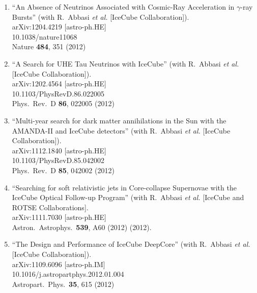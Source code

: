 \begin{enumerate}

\item ``An Absence of Neutrinos Associated with Cosmic-Ray
        Acceleration in   $\gamma$-ray Bursts'' (with
        R.~Abbasi {\it et al.}  [IceCube   Collaboration]).
        \\{}arXiv:1204.4219 [astro-ph.HE]
        \\{}10.1038/nature11068 \\{}Nature {\bf 484}, 351
        (2012) %

\item ``A Search for UHE Tau Neutrinos with IceCube'' (with
        R.~Abbasi {\it et   al.}  [IceCube Collaboration]).
        \\{}arXiv:1202.4564 [astro-ph.HE]
        \\{}10.1103/PhysRevD.86.022005 \\{}Phys.\ Rev.\ D
        {\bf 86}, 022005   (2012) %

\item ``Multi-year search for dark matter annihilations in
        the Sun with the   AMANDA-II and IceCube detectors''
        (with R.~Abbasi {\it et al.}   [IceCube
        Collaboration]).  \\{}arXiv:1112.1840 [astro-ph.HE]
        \\{}10.1103/PhysRevD.85.042002 \\{}Phys.\ Rev.\ D
        {\bf 85}, 042002   (2012) %

\item ``Searching for soft relativistic jets in
        Core-collapse Supernovae   with the IceCube Optical
        Follow-up Program'' (with R.~Abbasi {\it et     al.}
        [IceCube and ROTSE Collaborations].
        \\{}arXiv:1111.7030   [astro-ph.HE] \\{}Astron.\
        Astrophys.\ {\bf 539}, A60 (2012) %
        (2012).

\item ``The Design and Performance of IceCube DeepCore''
        (with R.~Abbasi {\it   {\it et al.}}  [IceCube
        Collaboration]).  \\{}arXiv:1109.6096 [astro-ph.IM]
        \\{}10.1016/j.astropartphys.2012.01.004
        \\{}Astropart.\ Phys.\ {\bf     35}, 615 (2012)


\end{enumerate}
